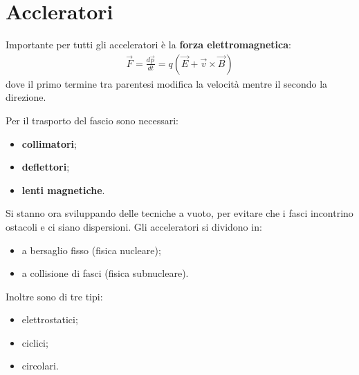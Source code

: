 \documentclass[a4paper,11pt,twoside,openany]{book}
\theoremstyle{definition}
\theoremstyle{plain}
\theoremstyle{plain}
\theoremstyle{definition}
\begin{document}
\chapter{Accleratori} %
Importante per tutti gli acceleratori è la \textbf{forza elettromagnetica}:
\begin{equation}\begin{split}
\vec F=\frac{d\vec p}{dt}=q\left(\vec E+\vec v \times \vec B\right)
\end{split}\end{equation}
dove il primo termine tra parentesi modifica la velocità mentre il secondo la direzione.

Per il trasporto del fascio sono necessari:
\begin{itemize}
\item \textbf{collimatori};
\item \textbf{deflettori};
\item \textbf{lenti magnetiche}.
\end{itemize}
Si stanno ora sviluppando delle tecniche a vuoto, per evitare che i fasci incontrino ostacoli e ci siano dispersioni. Gli acceleratori si dividono in:
\begin{itemize}
\item a bersaglio fisso (fisica nucleare);
\item a collisione di fasci (fisica subnucleare).
\end{itemize}
Inoltre sono di tre tipi:
\begin{itemize}
\item elettrostatici;
\item ciclici;
\item circolari.
\end{itemize}
\end{document}
